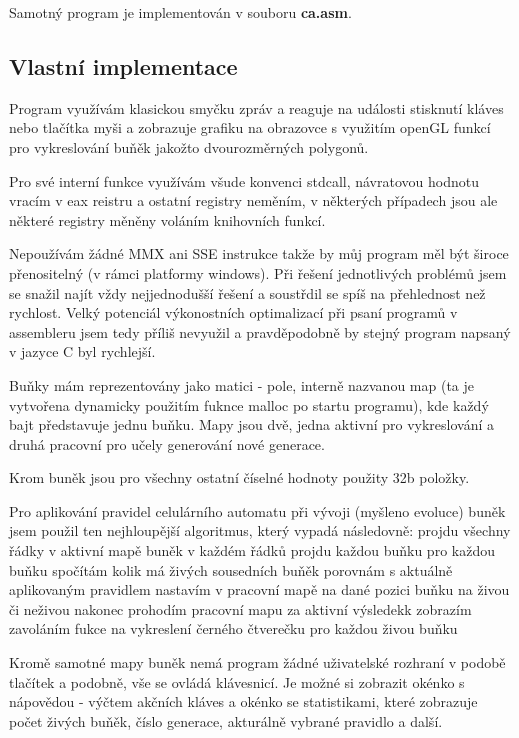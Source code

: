 \documentclass[11pt,a4paper,titlepage]{article}
\begin{document}
Samotný program je implementován v souboru {\bf ca.asm}.


\subsection{Vlastní implementace}
Program využívám klasickou smyčku zpráv a reaguje na události stisknutí kláves nebo tlačítka myši a zobrazuje grafiku na obrazovce s využitím openGL funkcí pro vykreslování buňěk jakožto dvourozměrných polygonů.

Pro své interní funkce využívám všude konvenci stdcall, návratovou hodnotu vracím v eax reistru a ostatní registry neměním, v některých případech jsou ale některé registry měněny voláním knihovních funkcí.

Nepoužívám žádné MMX ani SSE instrukce takže by můj program měl být široce přenositelný (v rámci platformy windows). Při řešení jednotlivých problémů jsem se snažil najít vždy nejjednodušší řešení a soustřdil se spíš na přehlednost než rychlost. Velký potenciál výkonostních optimalizací při psaní programů v assembleru jsem tedy příliš nevyužil a pravděpodobně by stejný program napsaný v jazyce C byl rychlejší.

Buňky mám reprezentovány jako matici - pole, interně nazvanou map (ta je vytvořena dynamicky použitím fuknce malloc po startu programu), kde každý bajt představuje jednu buňku. Mapy jsou dvě, jedna aktivní pro vykreslování a druhá pracovní pro učely generování nové generace.

Krom buněk jsou pro všechny ostatní číselné hodnoty použity 32b položky.

Pro aplikování pravidel celulárního automatu při vývoji (myšleno evoluce) buněk jsem použil ten nejhloupější algoritmus, který vypadá následovně:
projdu všechny řádky v aktivní mapě buněk
v každém řádků projdu každou buňku
pro každou buňku spočítám kolik má živých sousedních buňěk
porovnám s aktuálně aplikovaným pravidlem
nastavím v pracovní mapě na dané pozici buňku na živou či neživou
nakonec prohodím pracovní mapu za aktivní
výsledekk zobrazím zavoláním fukce na vykreslení černého čtverečku pro každou živou buňku 

Kromě samotné mapy buněk nemá program žádné uživatelské rozhraní v podobě tlačítek a podobně, vše se ovládá klávesnicí. Je možné si zobrazit okénko s nápovědou - výčtem akčních kláves a okénko se statistikami, které zobrazuje počet živých buňěk, číslo generace, akturálně vybrané pravidlo a další.
\end{document}
